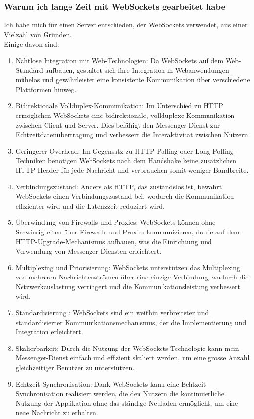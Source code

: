 \subsubsection{Warum ich lange Zeit mit WebSockets gearbeitet habe}
Ich habe mich für einen Server entschieden, der WebSockets verwendet, aus einer Vielzahl von Gründen.\\
Einige davon sind:  \cite{fette2011websocket}\cite{gupta2017websockets}
            \begin{enumerate}
                \item Nahtlose Integration mit Web-Technologien: Da WebSockets auf dem Web-Standard aufbauen, gestaltet sich ihre Integration in Webanwendungen mühelos und gewährleistet eine konsistente Kommunikation über verschiedene Plattformen hinweg.
                \item Bidirektionale Vollduplex-Kommunikation: Im Unterschied zu HTTP ermöglichen WebSockets eine bidirektionale, vollduplexe Kommunikation zwischen Client und Server. Dies befähigt den Messenger-Dienst zur Echtzeitdatenübertragung und verbessert die Interaktivität zwischen Nutzern.
                \item Geringerer Overhead: Im Gegensatz zu HTTP-Polling oder Long-Polling-Techniken benötigen WebSockets nach dem Handshake keine zusätzlichen HTTP-Header für jede Nachricht und verbrauchen somit weniger Bandbreite.
                \item Verbindungszustand: Anders als HTTP, das zustandslos ist, bewahrt WebSockets einen Verbindungszustand bei, wodurch die Kommunikation effizienter wird und die Latenzzeit reduziert wird.
                \item Überwindung von Firewalls und Proxies: WebSockets können ohne Schwierigkeiten über Firewalls und Proxies kommunizieren, da sie auf dem HTTP-Upgrade-Mechanismus aufbauen, was die Einrichtung und Verwendung von Messenger-Diensten erleichtert.
                \item Multiplexing und Priorisierung: WebSockets unterstützen das Multiplexing von mehreren Nachrichtenströmen über eine einzige Verbindung, wodurch die Netzwerkauslastung verringert und die Kommunikationsleistung verbessert wird.
                \item Standardisierung  \cite{8757486}: WebSockets sind ein weithin verbreiteter und standardisierter Kommunikationsmechanismus, der die Implementierung und Integration erleichtert.
                \item Skalierbarkeit: Durch die Nutzung der WebSockets-Technologie kann mein Messenger-Dienst einfach und effizient skaliert werden, um eine grosse Anzahl gleichzeitiger Benutzer zu unterstützen.
                \item Echtzeit-Synchronisation: Dank WebSockets kann eine Echtzeit-Synchronisation realisiert werden, die den Nutzern die kontinuierliche Nutzung der Applikation ohne das ständige Neuladen ermöglicht, um eine neue Nachricht zu erhalten.
            \end{enumerate}
